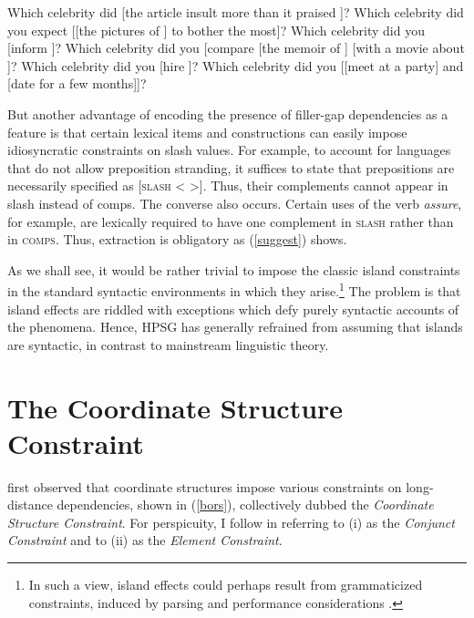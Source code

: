 \documentclass[output=paper
 	        ,biblatex
                ,babelshorthands
                ,newtxmath
                ,draftmode
                ,colorlinks, citecolor=brown
]{langscibook}
\begin{document}
\eal  \label{cc5}
\ex Which celebrity did  [the article insult \spc more than it praised \spc]?
\ex  Which celebrity  did you expect [[the pictures of \spc ] to bother \spc the most]?
\ex Which celebrity did you [inform ]?
\ex Which celebrity did you [compare [the memoir of \spc] [with a movie about \spc]?
\ex Which celebrity  did you [hire ]?
\ex Which celebrity  did you [[meet \spcs at a party] and [date \spcs for a few months]]?
\zl 

But another advantage of encoding the presence of filler-gap dependencies as a feature is that
certain lexical items and constructions can easily impose idiosyncratic constraints on {\sc slash}
values. For example, to account for  languages that do not allow preposition stranding,
it suffices to state that prepositions are necessarily specified as [\textsc{slash} < >]. Thus,
their complements cannot appear in {\sc slash} instead of {\sc comps}. 
The converse also occurs. Certain uses of the verb \emph{assure}, for example, 
are lexically required to have one complement in \textsc{slash} rather
   than in \textsc{comps}. Thus, extraction is obligatory as (\ref{suggest}) shows.
   
\eal \label{suggest}   
\zl

As we shall see, it would be rather trivial to impose the classic island constraints in the standard syntactic
environments in which they arise.\footnote{In such a view, island effects could perhaps result from
grammaticized constraints, induced by parsing and performance considerations  
\citep{prichett,fodor78,Fodor83}.}
 The problem is that island effects are riddled with exceptions which
defy purely syntactic accounts of the phenomena.  Hence, HPSG has generally refrained from
assuming that islands are syntactic, in contrast to mainstream linguistic theory.


\section{The Coordinate Structure Constraint}

\citet{Ross67} first observed that coordinate structures
impose various constraints on long-distance dependencies, shown in  (\ref{bors}), collectively dubbed the
\emph{Coordinate Structure Constraint}. For perspicuity,  I  follow \citet{grosu73} in referring to (i) as the \emph{Conjunct Constraint} and to (ii) as the \emph{Element Constraint}.
\end{document}
